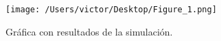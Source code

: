 \documentclass{article}
\begin{document}
\begin{figure}[H]
\begin{center}
	\texttt{[image: /Users/victor/Desktop/Figure\_1.png]}
	\caption{Gráfica con resultados de la simulación.}
	\label{fig:tarea.1}
\end{center}
\end{figure}














\end{document}
